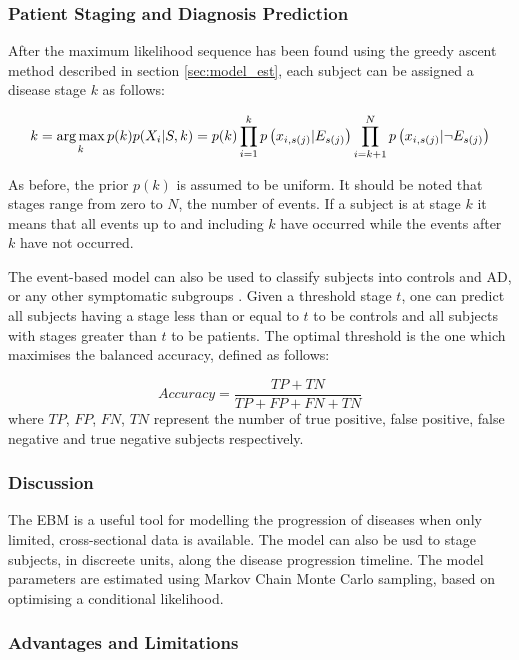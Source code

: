 \subsubsection{Patient Staging and Diagnosis Prediction}
\label{sec:staging}

After the maximum likelihood sequence has been found using the greedy ascent method described in section \ref{sec:model_est}, each subject can be assigned a disease stage $k$ as follows:

\begin{equation}
\label{eq:staging}
 k = \operatorname*{arg\,max}_k p(k) p(X_i | S, k) = p(k) \prod_{i=1}^k p\left(x_{i,s(j)} | E_{s(j)} \right) \prod_{i=k+1}^N p\left(x_{i,s(j)} | \neg E_{s(j)}\right)
\end{equation}
 
As before, the prior $p(k)$ is assumed to be uniform. It should be noted that stages range from zero to $N$, the number of events. If a subject is at stage $k$ it means that all events up to and including $k$ have occurred while the events after $k$ have not occurred. 

The event-based model can also be used to classify subjects into controls and AD, or any other symptomatic subgroups \cite{young2014data}. Given a threshold stage $t$, one can predict all subjects having a stage less than or equal to $t$ to be controls and all subjects with stages greater than $t$ to be patients. The optimal threshold is the one which maximises the balanced accuracy, defined as follows:

\begin{equation}
 Accuracy = \frac{TP + TN}{TP + FP + FN + TN}
\end{equation}
where $TP$, $FP$, $FN$, $TN$ represent the number of true positive, false positive, false negative and true negative subjects respectively.

 
\subsubsection{Discussion}

The EBM is a useful tool for modelling the progression of diseases when only limited, cross-sectional data is available. The model can also be usd to stage subjects, in discreete units, along the disease progression timeline. The model parameters are estimated using Markov Chain Monte Carlo sampling, based on optimising a conditional likelihood. 

\subsubsection{Advantages and Limitations}

